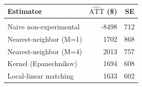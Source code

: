 
\begin{tabular}[t]{lrr}
\toprule
\textbf{Estimator} & \textbf{$\widehat{\text{ATT}}$ (\$)} & \textbf{SE}\\
\midrule
\cellcolor[HTML]{FBEFC4}{Experimental (truth)} & \cellcolor[HTML]{FBEFC4}{1794} & \cellcolor[HTML]{FBEFC4}{633}\\
Naive non-experimental & -8498 & 712\\
Nearest-neighbor (M=1) & 1702 & 868\\
Nearest-neighbor (M=4) & 2013 & 757\\
Kernel (Epanechnikov) & 1694 & 608\\
Local-linear matching & 1633 & 602\\
\bottomrule
\end{tabular}
